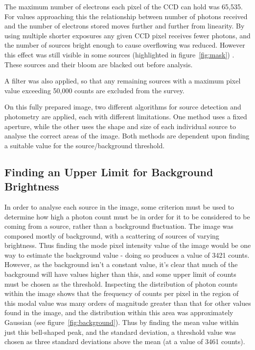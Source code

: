 \documentclass[a4paper,11pt,twoside]{article}
\begin{document}
The maximum number of electrons each pixel of the CCD can hold was 65,535. For values approaching this the relationship between number of photons received and the number of electrons stored moves further and further from linearity.
By using multiple shorter exposures any given CCD pixel receives fewer photons, and the number of sources bright enough to cause overflowing was reduced.
However this effect was still visible in some sources (highlighted in figure~\ref{fig:mask}) . These sources and their bloom are blacked out before analysis.

A filter was also applied, so that any remaining sources with a maximum pixel value exceeding 50,000 counts are excluded from the survey.

On this fully prepared image, two different algorithms for source detection and photometry are applied, each with different limitations. One method uses a fixed aperture, while the other uses the shape and size of each individual source to analyse the correct areas of the image. Both methods are dependent upon finding a suitable value for the source/background threshold.

\subsection{Finding an Upper Limit for Background Brightness}

In order to analyse each source in the image, some criterion must be used to determine how high a photon count must be in order for it to be considered to be coming from a source, rather than a background fluctuation.
The image was composed mostly of background, with a scattering of sources of varying brightness. Thus finding the mode pixel intensity value of the image would be one way to estimate the background value - doing so produces a value of 3421 counts. However, as the background isn't a constant value, it's clear that much of the background will have values higher than this, and some upper limit of counts must be chosen as the threshold.
Inspecting the distribution of photon counts within the image shows that the frequency of counts per pixel in the region of this modal value was many orders of magnitude greater than that for other values found in the image, and the distribution within this area was approximately Gaussian (see figure~\ref{fig:background}). Thus by finding the mean value within just this bell-shaped peak, and the standard deviation, a threshold value was chosen as three standard deviations above the mean (at a value of 3461 counts).
\end{document}
